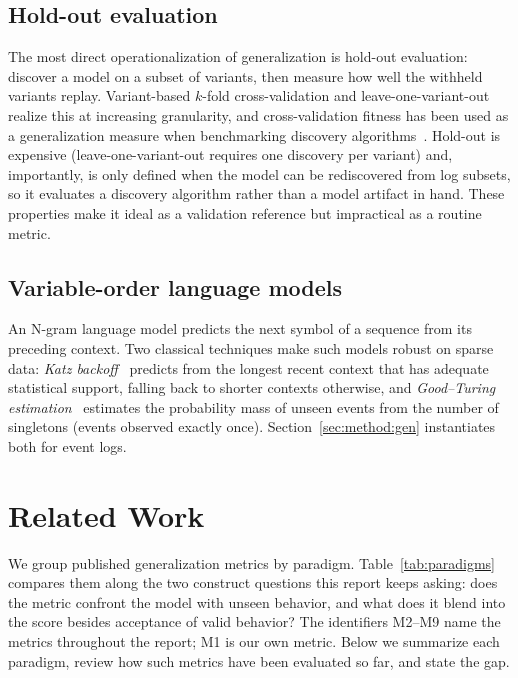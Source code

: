 \documentclass[runningheads]{llncs}
\begin{document}
\subsection{Hold-out evaluation}
The most direct operationalization of generalization is hold-out evaluation: discover a model on a subset of variants, then measure how well the withheld variants replay. Variant-based $k$-fold cross-validation and leave-one-variant-out realize this at increasing granularity, and cross-validation fitness has been used as a generalization measure when benchmarking discovery algorithms~\cite{augusto2019benchmark}. Hold-out is expensive (leave-one-variant-out requires one discovery per variant) and, importantly, is only defined when the model can be rediscovered from log subsets, so it evaluates a discovery algorithm rather than a model artifact in hand. These properties make it ideal as a validation reference but impractical as a routine metric.

\subsection{Variable-order language models}
An N-gram language model predicts the next symbol of a sequence from its preceding context. Two classical techniques make such models robust on sparse data: \emph{Katz backoff}~\cite{katz1987} predicts from the longest recent context that has adequate statistical support, falling back to shorter contexts otherwise, and \emph{Good--Turing estimation}~\cite{gale1995gt} estimates the probability mass of unseen events from the number of singletons (events observed exactly once). Section~\ref{sec:method:gen} instantiates both for event logs.

\section{Related Work}
\label{sec:related}

We group published generalization metrics by paradigm. Table~\ref{tab:paradigms} compares them along the two construct questions this report keeps asking: does the metric confront the model with unseen behavior, and what does it blend into the score besides acceptance of valid behavior? The identifiers M2--M9 name the metrics throughout the report; M1 is our own metric. Below we summarize each paradigm, review how such metrics have been evaluated so far, and state the gap.
\end{document}
